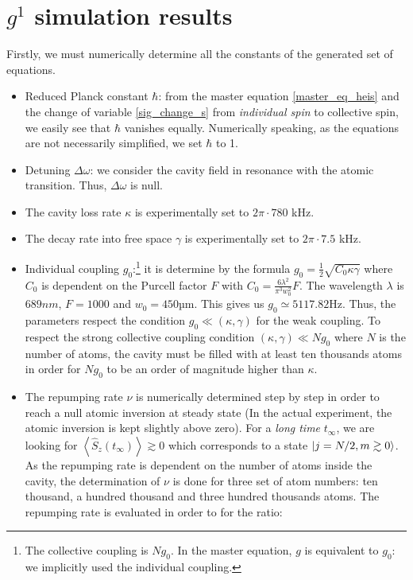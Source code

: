 \documentclass[11pt]{report}
\DeclarePairedDelimiter\ket{\lvert}{\rangle}
\begin{document}
\section{$g^1$ simulation results}

Firstly, we must  numerically determine all the constants of the generated set of equations.

\begin{itemize}
	\item Reduced Planck constant $\hbar$: from the master equation \ref{master_eq_heis} and the change of variable \ref{sig_change_s} from \textit{individual spin} to collective spin, we easily see that $\hbar$ vanishes equally. Numerically speaking, as the equations are not necessarily simplified, we set $\hbar$ to 1.
	\item Detuning $\Delta\omega$: we consider the cavity field in resonance with the atomic transition. Thus, $\Delta\omega$ is null.
	\item The cavity loss rate $\kappa$ is experimentally set to $2\pi \cdot 780$ kHz.
	\item The decay rate into free space $\gamma$ is experimentally set to $2\pi \cdot 7.5$ kHz.
	\item Individual coupling $g_0$:\footnote{The collective coupling is $Ng_0$. In the master equation, $g$ is equivalent to $g_0$: we implicitly used the individual coupling.} it is determine by the formula $g_0=\frac{1}{2}\sqrt{C_0\kappa\gamma}$ where $C_0$ is dependent on the Purcell factor $F$ with $C_0=\frac{6\lambda^2}{\pi^3w_0^2}F$. The wavelength $\lambda$ is $689nm$, $F=1000$ and $w_0=450$µm. This gives us $g_0\simeq5117.82$Hz. Thus, the parameters respect the condition $g_0\ll(\kappa, \gamma)$ for the weak coupling. To respect the strong collective coupling condition $(\kappa, \gamma) \ll Ng_0$ where $N$ is the number of atoms, the cavity must be filled with at least ten thousands atoms in order for $Ng_0$ to be an order of magnitude higher than $\kappa$.
	\item The repumping rate $\nu$ is numerically determined step by step in order to reach a null atomic inversion at steady state (In the actual experiment, the atomic inversion is kept slightly above zero). For a \textit{long time} $t_\infty$, we are looking for $\left\langle \hat{S}_z(t_\infty) \right\rangle \gtrsim 0$ which corresponds to a state $\ket{j=N/2, m \gtrsim 0}$. As the repumping rate is dependent on the number of atoms inside the cavity, the determination of $\nu$ is done for three set of atom numbers: ten thousand, a hundred thousand and three hundred thousands atoms. The repumping rate is evaluated in order to for the ratio:

\end{itemize}
\end{document}
